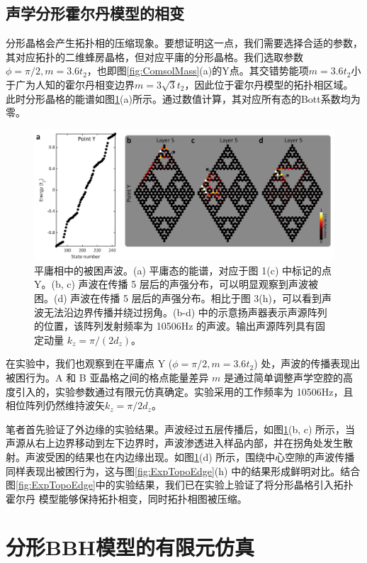 \subsection{声学分形霍尔丹模型的相变}
分形晶格会产生拓扑相的压缩现象。要想证明这一点，我们需要选择合适的参数，其对应拓扑的二维蜂房晶格，但对应平庸的分形晶格。我们选取参数$\phi = \pi/2, m = 3.6t_2$，也即图\ref{fig:ComsolMass}(a)的Y点。其交错势能项$m = 3.6t_2$小于广为人知的霍尔丹相变边界$m = 3\sqrt{3}t_2$，因此位于霍尔丹模型的拓扑相区域。此时分形晶格的能谱如图\ref{fig:ExpTrivial}(a)所示。通过数值计算，其对应所有态的Bott系数均为零。

\begin{figure}[htbp]
    \centering
    \includegraphics[width=0.85\linewidth]{figure/FracHaldExp/ExpTrivial.png}
    \caption{平庸相中的被困声波。(a) 平庸态的能谱，对应于图 1(c) 中标记的点 Y。(b, c) 声波在传播 5 层后的声强分布，可以明显观察到声波被困。(d) 声波在传播 5 层后的声强分布。相比于图 3(h)，可以看到声波无法沿边界传播并绕过拐角。(b-d) 中的示意扬声器表示声源阵列的位置，该阵列发射频率为 10506Hz 的声波。输出声源阵列具有固定动量 $k_z = \pi/(2d_z)$。}
    \label{fig:ExpTrivial}
\end{figure}

在实验中，我们也观察到在平庸点 Y ($\phi = \pi/2, m = 3.6t_2$) 处，声波的传播表现出被困行为。A 和 B 亚晶格之间的格点能量差异 $m$ 是通过简单调整声学空腔的高度引入的，实验参数通过有限元仿真确定。实验采用的工作频率为 10506Hz，且相位阵列仍然维持波矢$k_z=\pi/2d_z$。

笔者首先验证了外边缘的实验结果。声波经过五层传播后，如图\ref{fig:ExpTrivial}(b, c) 所示，当声源从右上边界移动到左下边界时，声波渗透进入样品内部，并在拐角处发生散射。声波受困的结果也在内边缘出现。如图\ref{fig:ExpTrivial}(d) 所示，围绕中心空隙的声波传播同样表现出被困行为，这与图\ref{fig:ExpTopoEdge}(h) 中的结果形成鲜明对比。结合图\ref{fig:ExpTopoEdge}中的实验结果，我们已在实验上验证了将分形晶格引入拓扑 霍尔丹 模型能够保持拓扑相变，同时拓扑相图被压缩。

\section{分形BBH模型的有限元仿真}
